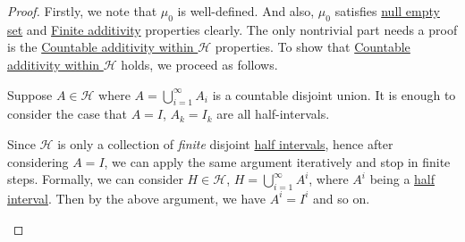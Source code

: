 \begin{proof}
	Firstly, we note that \(\mu _0\) is well-defined. And also, \(\mu _0\) satisfies \hyperref[def:pre-measure-null-empty-set]{null empty set} and
	\hyperref[def:pre-measure-finite-additivity]{Finite additivity} properties clearly. The only nontrivial part needs a proof is the
	\hyperref[def:pre-measure-countable-additivity-within-the-algebra]{Countable additivity within \(\mathcal{H}\)} properties.
	To show that \hyperref[def:pre-measure-countable-additivity-within-the-algebra]{Countable additivity within \(\mathcal{H}\)} holds, we proceed as follows.

	Suppose \(A\in \mathcal{H} \) where \(A = \bigcup\limits_{i=1}^{\infty} A_{i}\) is a countable
	disjoint union. It is enough to consider the case that \(A = I\), \(A_{k} = I_{k}\) are all
	half-intervals.
	\begin{remark}
		Since \(\mathcal{H}\) is only a collection of \emph{finite} disjoint \hyperref[def:half-intervals]{half intervals}, hence
		after considering \(A = I\), we can apply the same argument iteratively and stop in finite steps. Formally, we can consider \(H\in \mathcal{H} \),
		\(H = \bigcup_{i=1}^{\infty} A^{i}\), where \(A^i\) being a \hyperref[def:half-intervals]{half interval}. Then by the above argument, we have \(A^i = I^i\) and so on.
	\end{remark}


\end{proof}
